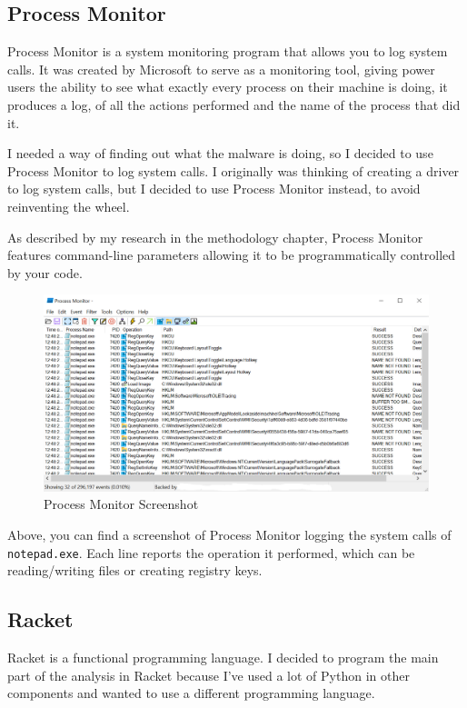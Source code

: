 \subsection{Process Monitor}
Process Monitor is a system monitoring program that allows you to log system calls.
It was created by Microsoft to serve as a monitoring tool, giving power users
the ability to see what exactly every process on their machine is doing,
it produces a log, of all the actions performed and the name of the process that did it.

I needed a way of finding out what the malware is doing,
so I decided to use Process Monitor to log system calls.
I originally was thinking of creating a driver to log system calls,
but I decided to use Process Monitor instead,
to avoid reinventing the wheel.

As described by my research in the methodology chapter,
Process Monitor features command-line parameters
allowing it to be programmatically controlled by your code.

\begin{figure}[h!]
    \centering
    \label{image:procmonScreenshot}
    \includegraphics[width=1\textwidth]{images/screenshots/process_monitor}
    \caption{Process Monitor Screenshot}
\end{figure}

Above, you can find a screenshot of Process Monitor
logging the system calls of \texttt{notepad.exe}.
Each line reports the operation it performed,
which can be reading/writing files or creating registry keys.

\bigbreak
\bigbreak
\bigbreak

\subsection{Racket}
Racket is a functional programming language. \cite{racket}
I decided to program the main part of the analysis in Racket
because I've used a lot of Python in other components and
wanted to use a different programming language.

